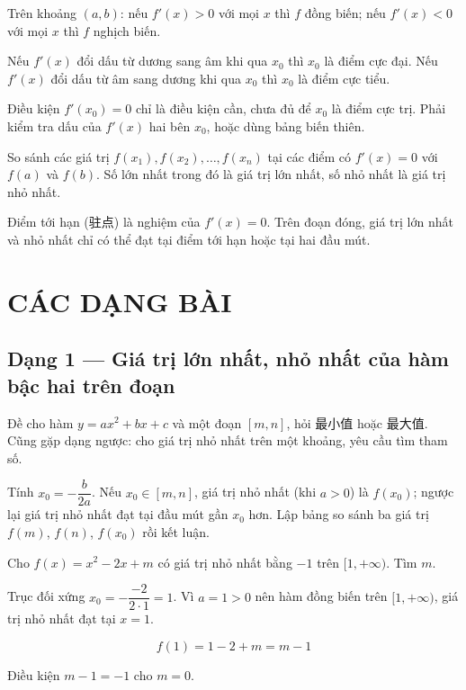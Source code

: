 \documentclass[11pt, a4paper]{article}
\begin{document}
\begin{dinhly}
Trên khoảng $(a, b)$: nếu $f'(x) > 0$ với mọi $x$ thì $f$ đồng biến; nếu $f'(x) < 0$ với mọi $x$ thì $f$ nghịch biến.
\end{dinhly}
\begin{dinhly}
Nếu $f'(x)$ đổi dấu từ dương sang âm khi qua $x_0$ thì $x_0$ là điểm cực đại. Nếu $f'(x)$ đổi dấu từ âm sang dương khi qua $x_0$ thì $x_0$ là điểm cực tiểu.

 Điều kiện $f'(x_0) = 0$ chỉ là điều kiện cần, chưa đủ để $x_0$ là điểm cực trị. Phải kiểm tra dấu của $f'(x)$ hai bên $x_0$, hoặc dùng bảng biến thiên.
\end{dinhly}
\begin{dinhly}
So sánh các giá trị $f(x_1), f(x_2), \dots, f(x_n)$ tại các điểm có $f'(x) = 0$ với $f(a)$ và $f(b)$. Số lớn nhất trong đó là giá trị lớn nhất, số nhỏ nhất là giá trị nhỏ nhất.

 Điểm tới hạn (驻点) là nghiệm của $f'(x) = 0$. Trên đoạn đóng, giá trị lớn nhất và nhỏ nhất chỉ có thể đạt tại điểm tới hạn hoặc tại hai đầu mút.

\end{dinhly}
\section{CÁC DẠNG BÀI}

\subsection{Dạng 1 — Giá trị lớn nhất, nhỏ nhất của hàm bậc hai trên đoạn}

 Đề cho hàm $y = ax^2 + bx + c$ và một đoạn $[m, n]$, hỏi 最小值 hoặc 最大值. Cũng gặp dạng ngược: cho giá trị nhỏ nhất trên một khoảng, yêu cầu tìm tham số.

 Tính $x_0 = -\dfrac{b}{2a}$. Nếu $x_0 \in [m, n]$, giá trị nhỏ nhất (khi $a > 0$) là $f(x_0)$; ngược lại giá trị nhỏ nhất đạt tại đầu mút gần $x_0$ hơn. Lập bảng so sánh ba giá trị $f(m)$, $f(n)$, $f(x_0)$ rồi kết luận.

\begin{vidu}[{1}]
Cho $f(x) = x^2 - 2x + m$ có giá trị nhỏ nhất bằng $-1$ trên $[1, +\infty)$. Tìm $m$.

Trục đối xứng $x_0 = -\dfrac{-2}{2 \cdot 1} = 1$. Vì $a = 1 > 0$ nên hàm đồng biến trên $[1, +\infty)$, giá trị nhỏ nhất đạt tại $x = 1$.

$$f(1) = 1 - 2 + m = m - 1$$

Điều kiện $m - 1 = -1$ cho $m = 0$.

\end{vidu}
\end{document}

